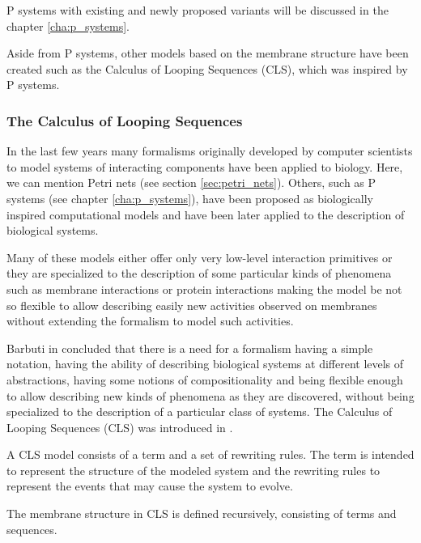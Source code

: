 P systems with existing and newly proposed variants will be discussed in the chapter \ref{cha:p_systems}.

Aside from P systems, other models based on the membrane structure have been created such as the Calculus of Looping Sequences (CLS), which was inspired by P systems.




\subsubsection{The Calculus of Looping Sequences} %
\label{subs:calculus_of_looping_sequences}

In the last few years many formalisms originally developed by computer scientists to model systems of interacting components have been applied to biology. Here, we can mention Petri nets (see section \ref{sec:petri_nets}). Others, such as P systems (see chapter \ref{cha:p_systems}), have been proposed as biologically inspired computational models and have been later applied to the description of biological systems.

Many of these models either offer only very low-level interaction primitives or they are specialized to the description of some particular kinds of phenomena such as membrane interactions or protein interactions making the model be not so flexible to allow describing easily new activities observed on membranes without extending the formalism to model such activities.

Barbuti in \cite{Barbuti07CLS} concluded that there is a need for a formalism having a simple notation, having the ability of describing biological systems at different levels of abstractions, having some notions of compositionality and being flexible enough to allow describing new kinds of phenomena as they are discovered, without being specialized to the description of a particular class of systems. The  Calculus of Looping Sequences (CLS) was introduced in \cite{Barbuti07CLS}.

A CLS model consists of a term and a set of rewriting rules. The term is intended to represent the structure of the modeled system and the rewriting rules to represent the events that may cause the system to evolve.

The membrane structure in CLS is defined recursively, consisting of terms and sequences.

